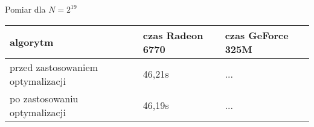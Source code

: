 
Pomiar dla $N = {2}^{19}$

\begin{tabular}{ |p{\dimexpr 0.3\linewidth}|
                  p{\dimexpr 0.3\linewidth}|
                  p{\dimexpr 0.3\linewidth}| }
 \hline algorytm & czas Radeon 6770 & czas GeForce 325M\\
 \hline
 przed zastosowaniem optymalizacji & 46,21s & ...\\
 \hline
 po zastosowaniu optymalizacji & 46,19s & ...\\
 \hline
\end{tabular}